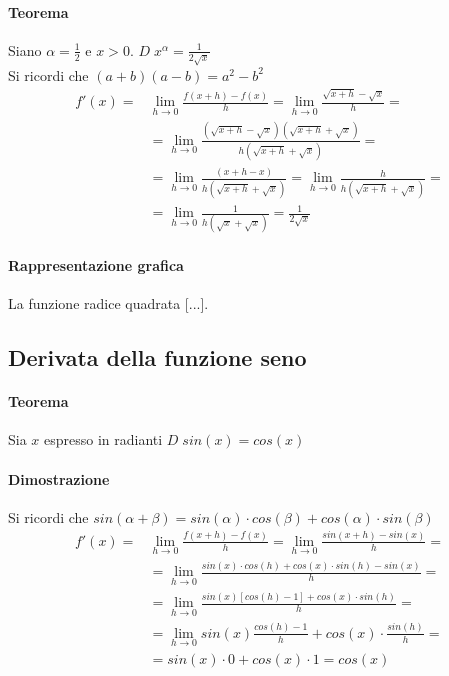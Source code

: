 \documentclass[a4paper,14pt]{extarticle}
\begin{document}
\paragraph{Teorema \\} Siano $\alpha = \frac{1}{2}$ e $x > 0$. $D\;x^\alpha = \frac{1}{2\sqrt{x}}$ \\ Si ricordi che $(a+b)(a-b)=a^2-b^2$
\large
\begin{equation} \label{eq_radice}
\begin{split}
f'(x) = & \lim_{h\to0}\frac{f(x+h)-f(x)}{h} = \lim_{h\to0}\frac{\sqrt{x+h}-\sqrt{x}}{h} = \\ & = \lim_{h\to0}\frac{(\sqrt{x+h}-\sqrt{x})(\sqrt{x+h}+\sqrt{x})}{h(\sqrt{x+h}+\sqrt{x})} = \\ & = \lim_{h\to0}\frac{(x+h-x)}{h(\sqrt{x+h}+\sqrt{x})} = \lim_{h\to0}\frac{h}{h(\sqrt{x+h}+\sqrt{x})} = \\ & = \lim_{h\to0}\frac{1}{h(\sqrt{x}+\sqrt{x})} = \frac{1}{2\sqrt{x}}
\end{split}
\end{equation}
\normalsize

\paragraph{Rappresentazione grafica \\}
La funzione radice quadrata [...].

\subsection{Derivata della funzione seno}
\paragraph{Teorema \\} Sia $x$ espresso in radianti $D\;sin(x) = cos(x)$
\paragraph{Dimostrazione \\} Si ricordi che $sin(\alpha+\beta)=sin(\alpha)\cdot cos(\beta)+cos(\alpha)\cdot sin(\beta)$
\large
\begin{equation} \label{eq_seno}
\begin{split}
f'(x) = & \lim_{h\to0}\frac{f(x+h)-f(x)}{h} = \lim_{h\to0}\frac{sin(x+h)-sin(x)}{h} = \\ & = \lim_{h\to0}\frac{sin(x)\cdot cos(h)+cos(x)\cdot sin(h)-sin(x)}{h} = \\ & = \lim_{h\to0}\frac{sin(x)[cos(h)-1]+cos(x)\cdot sin(h)}{h} = \\ & = \lim_{h\to0}sin(x)\frac{cos(h)-1}{h}+cos(x)\cdot\frac{sin(h)}{h} = \\ & = sin(x)\cdot0+cos(x)\cdot 1 =cos(x)
\end{split}
\end{equation}
\normalsize
\end{document}
